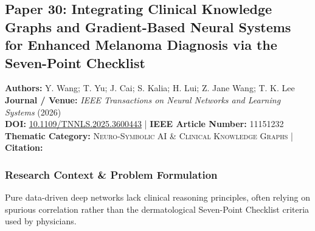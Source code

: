 \subsection{Paper 30: Integrating Clinical Knowledge Graphs and Gradient-Based Neural Systems for Enhanced Melanoma Diagnosis via the Seven-Point Checklist}
\label{sec:paper_30}

\begin{tcolorbox}[colback=gray!5!white,colframe=gray!75!black,title=\textbf{Metadata \& Citation Summary}]
\textbf{Authors:} Y. Wang; T. Yu; J. Cai; S. Kalia; H. Lui; Z. Jane Wang; T. K. Lee \\
\textbf{Journal / Venue:} \textit{IEEE Transactions on Neural Networks and Learning Systems} (2026) \\
\textbf{DOI:} \href{https://doi.org/10.1109/TNNLS.2025.3600443}{10.1109/TNNLS.2025.3600443} \quad | \quad \textbf{IEEE Article Number:} 11151232 \\
\textbf{Thematic Category:} \textsc{Neuro-Symbolic AI \& Clinical Knowledge Graphs} \quad | \quad \textbf{Citation:} \cite{11151232}
\end{tcolorbox}

\subsubsection*{Research Context \& Problem Formulation}
Pure data-driven deep networks lack clinical reasoning principles, often relying on spurious correlation rather than the dermatological Seven-Point Checklist criteria used by physicians.

